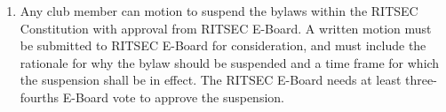 

\begin{enumerate}
  \item Any club member can motion to suspend the bylaws within the RITSEC
    Constitution with approval from RITSEC E-Board. A written motion must be
    submitted to RITSEC E-Board for consideration, and must include the
    rationale for why the bylaw should be suspended and a time frame for which
    the suspension shall be in effect. The RITSEC E-Board needs at least
    three-fourths E-Board vote to approve the suspension.
\end{enumerate}